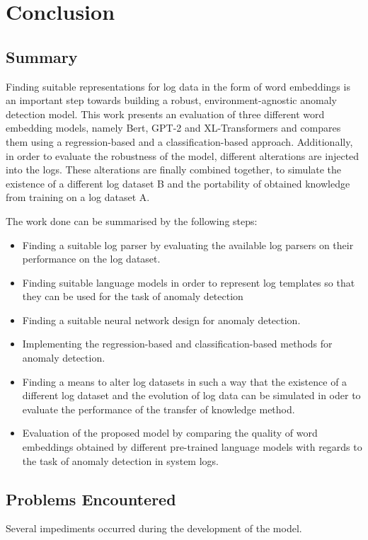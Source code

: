 \chapter{Conclusion\label{cha:conclusion}}



\section{Summary\label{sec:summary}}

Finding suitable representations for log data in the form of word embeddings is an important step towards building a robust, environment-agnostic anomaly detection model. This work presents an evaluation of three different word embedding models, namely Bert, GPT-2 and XL-Transformers and compares them using a regression-based and a classification-based approach. Additionally, in order to evaluate the robustness of the model, different alterations are injected into the logs. These alterations are finally combined together, to simulate the existence of a different log dataset B and the portability of obtained knowledge from training on a log dataset A.

The work done can be summarised by the following steps:
\begin{itemize}
		\item Finding a suitable log parser by evaluating the available log parsers on their performance on the log dataset.
		\item Finding suitable language models in order to represent log templates so that they can be used for the task of anomaly detection
		\item Finding a suitable neural network design for anomaly detection.
		\item Implementing the regression-based and classification-based methods for anomaly detection.
		\item Finding a means to alter log datasets in such a way that the existence of a different log dataset and the evolution of log data can be simulated in oder to evaluate the performance of the transfer of knowledge method.
		\item Evaluation of the proposed model by comparing the quality of word embeddings obtained by different pre-trained language models with regards to the task of anomaly detection in system logs.
\end{itemize}


\section{Problems Encountered\label{sec:problems}}
Several impediments occurred during the development of the model. 

